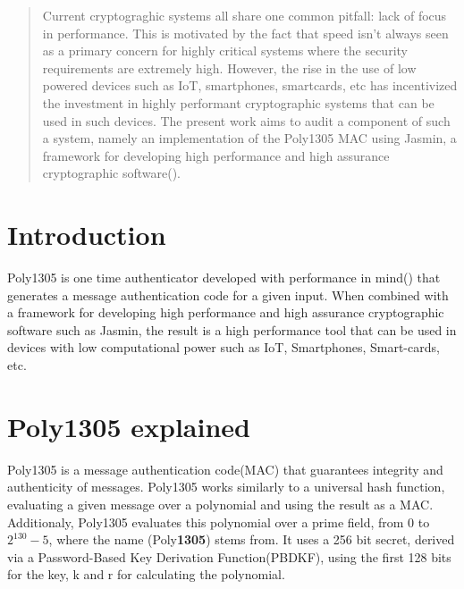 \documentclass[twocolumn]{article}
\begin{document}

\begin{abstract}
    Current cryptograghic systems all share one common pitfall: lack of focus in performance. This is motivated by the fact that speed isn't always seen as a primary concern
    for highly critical systems where the security requirements are extremely high. However, the rise in the use of low powered devices such as IoT, smartphones, smartcards,
    etc has incentivized the investment in highly performant cryptographic systems that can be used in such devices. The present work aims to audit a component of such 
    a system, namely an implementation of the Poly1305 MAC using Jasmin, a framework for developing high performance and high assurance cryptographic 
    software(\cite{jasmin_paper}).
\end{abstract}

\section{Introduction}
Poly1305 is one time authenticator developed with performance in mind(\cite{poly1305_aes_bernstein}) that generates a message authentication code for a given input. 
When combined with a framework for developing high performance and high assurance cryptographic software such as Jasmin, the result is a high performance tool that 
can be used in devices with low computational power such as IoT, Smartphones, Smart-cards, etc.

\section{Poly1305 explained}
Poly1305 is a message authentication code(MAC) that guarantees integrity and authenticity of messages. Poly1305 works similarly to a 
universal hash function, evaluating a given message over a polynomial and using the result as a MAC. Additionaly, Poly1305 evaluates this
polynomial over a prime field, from 0 to $2^{130}-5$, where the name (Poly\textbf{1305}) stems from. It uses a 256 bit secret, derived via a Password-Based Key Derivation
Function(PBDKF), using the first 128 bits for the key, k and r for calculating the polynomial.
\end{document}
